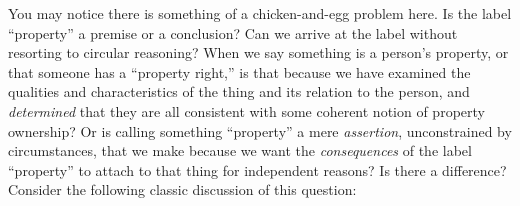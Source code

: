 You may notice there is something of a chicken-and-egg problem here. Is the
label ``property'' a premise or a conclusion? Can we arrive at the label
without resorting to circular reasoning? When we say something is a person's
property, or that someone has a ``property right,'' is that because we have
examined the qualities and characteristics of the thing and its relation to the
person, and \textit{determined} that they are all consistent with some coherent
notion of property ownership? Or is calling something ``property'' a mere
\textit{assertion}, unconstrained by circumstances, that we make because we
want the \textit{consequences} of the label ``property'' to attach to that
thing for independent reasons? Is there a difference? Consider the following
classic discussion of this question:

